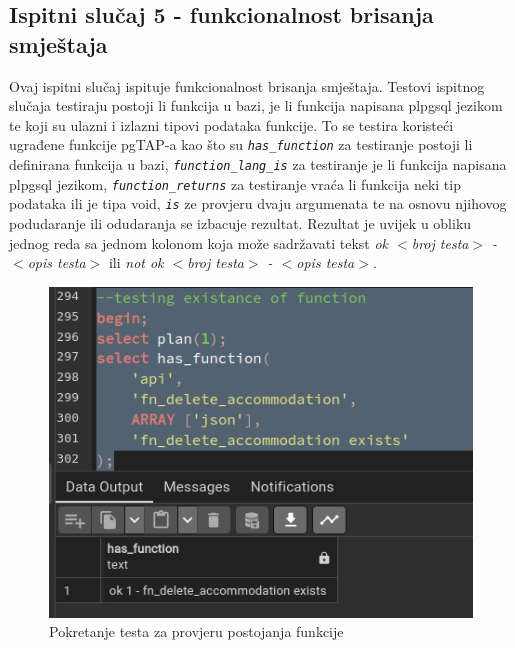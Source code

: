 				\subsection{Ispitni slučaj 5 - funkcionalnost brisanja smještaja}
				Ovaj ispitni slučaj ispituje funkcionalnost brisanja smještaja. Testovi ispitnog slučaja testiraju postoji li funkcija u bazi, je li funkcija napisana plpgsql jezikom te koji su ulazni i izlazni tipovi podataka funkcije. To se testira koristeći ugrađene funkcije pgTAP-a kao što su \textit{\texttt{has\_function}} za testiranje postoji li definirana funkcija u bazi, \textit{\texttt{function\_lang\_is}} za testiranje je li funkcija napisana plpgsql jezikom, \textit{\texttt{function\_returns}} za testiranje vraća li funkcija neki tip podataka ili je tipa void, \textit{\texttt{is\(\)}} ze provjeru dvaju argumenata te na osnovu njihovog podudaranje ili odudaranja se izbacuje rezultat. Rezultat je uvijek u obliku jednog reda sa jednom kolonom koja može sadržavati tekst \textit{ok $<$broj testa$>$ - $<$opis testa$>$} ili \textit{not ok $<$broj testa$>$ - $<$opis testa$>$}.
				\begin{figure}[H]
					\centering
					\includegraphics[width=\textwidth]{slike/unit_tests/ut_5/has_func.png}
					\caption{Pokretanje testa za provjeru postojanja funkcije}
					\label{fig: IS5-has_function}
				\end{figure}
